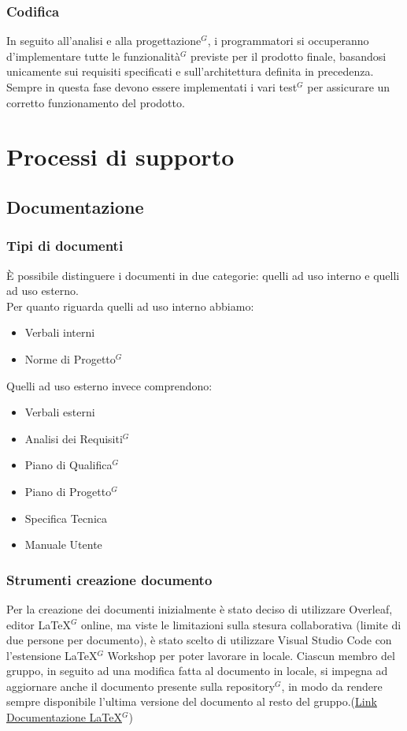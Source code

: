 \documentclass[a4paper,10pt]{article}
\begin{document}
\subsubsection{Codifica}
In seguito all'analisi e alla progettazione$^G$, i programmatori si occuperanno d'implementare tutte le funzionalità$^G$ 
previste per il prodotto finale, basandosi unicamente sui requisiti specificati e sull'architettura definita in precedenza. 
Sempre in questa fase devono essere implementati i vari test$^G$ per assicurare un corretto funzionamento del prodotto.

\section{Processi di supporto}
\subsection{Documentazione}
\subsubsection{Tipi di documenti}
È possibile distinguere i documenti in due categorie: quelli ad uso interno e quelli ad uso esterno. \\
Per quanto riguarda quelli ad uso interno abbiamo:
\begin{itemize}
  \item Verbali interni 
  \item Norme di Progetto$^G$
\end{itemize}
Quelli ad uso esterno invece comprendono:
\begin{itemize}
  \item Verbali esterni
  \item Analisi dei Requisiti$^G$
  \item Piano di Qualifica$^G$
  \item Piano di Progetto$^G$
  \item Specifica Tecnica
  \item Manuale Utente
\end{itemize}
\subsubsection{Strumenti creazione documento}
Per la creazione dei documenti inizialmente è stato deciso di utilizzare Overleaf, editor LaTeX$^G$ online, ma viste le limitazioni
sulla stesura collaborativa (limite di due persone per documento), è stato scelto di utilizzare Visual Studio Code con l'estensione
LaTeX$^G$ Workshop per poter lavorare in locale. Ciascun membro del gruppo, in seguito ad una modifica fatta al documento in locale,
si impegna ad aggiornare anche il documento presente sulla repository$^G$, in modo da rendere sempre disponibile l'ultima versione
del documento al resto del gruppo.(\href{https://www.latex-project.org/help/documentation/}{\underline{Link Documentazione LaTeX$^G$}})
\end{document}
